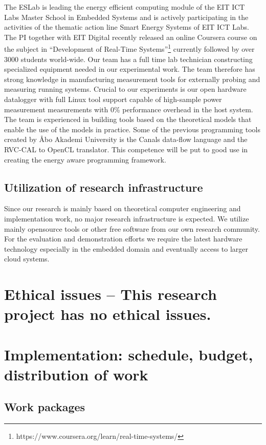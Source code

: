 \documentclass{article}
\begin{document}
The ESLab is leading the energy efficient computing module of the EIT ICT Labs Master School in Embedded Systems and is actively participating in the activities of the thematic action line Smart Energy Systems of EIT ICT Labs.
The PI together with EIT Digital recently released an online Coursera course on the subject in ``Development of Real-Time Systems''\footnote{https://www.coursera.org/learn/real-time-systems/} currently followed by over 3000 students world-wide.
Our team has a full time lab technician constructing specialized equipment needed in our experimental work. 
The team therefore has strong knowledge in manufacturing measurement tools for externally probing and measuring running systems. 
Crucial to our experiments is our open hardware datalogger with full Linux tool support capable of high-sample power measurement measurements with 0\% performance overhead in the host system. 
The team is experienced in building tools based on the theoretical models that enable the use of the models in practice. 
Some of the previous programming tools created by \AA{}bo Akademi University is the Canals data-flow language and the RVC-CAL to OpenCL translator. 
This competence will be put to good use in creating the energy aware programming framework.

\subsection{Utilization of research infrastructure}
Since our research is mainly based on theoretical computer engineering and implementation work, no major research infrastructure is expected.
We utilize mainly opensource tools or other free software from our own research community.
For the evaluation and demonstration efforts we require the latest hardware technology especially in the embedded domain and eventually access to larger cloud systems.

\section{Ethical issues \small -- This research project has no ethical issues. }

\section{Implementation: schedule, budget, distribution of work}
\subsection{Work packages}
\end{document}
